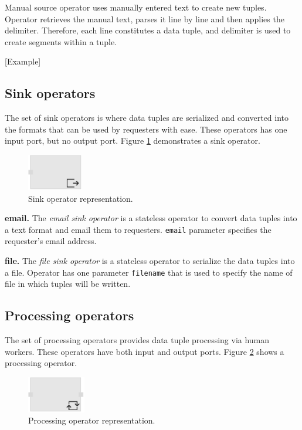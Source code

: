 Manual source operator uses manually entered text to create new tuples. Operator 
retrieves the manual text, parses it line by line and then applies the delimiter. 
Therefore, each line constitutes a data tuple, and delimiter is used to create segments 
within a tuple.

[Example]

\subsection{Sink operators}
The set of sink operators is where data tuples are serialized and converted into 
the formats that can be used by requesters with ease. These operators has one 
input port, but no output port. Figure \ref{fig:sink operator} demonstrates a sink operator.

\begin{figure}[ht]
	\centering
	\includegraphics[height=60px]{figures/SinkOperator.pdf}
	\caption{Sink operator representation.}
	\label{fig:sink operator}
\end{figure}

\textbf{email.}
The \textit{email sink operator} is a stateless operator to convert data tuples into a 
text format and email them to requesters. \texttt{email} parameter specifies the 
requester's email address. 

\textbf{file.}
The \textit{file sink operator} is a stateless operator to serialize the data tuples into 
a file. Operator has one parameter \texttt{filename} that is used to specify the name 
of file in which tuples will be written.

\subsection{Processing operators}
The set of processing operators provides data tuple processing via human workers. 
These operators have both input and output ports. Figure \ref{fig:processing operator} shows 
a processing operator.

\begin{figure}[ht]
	\centering
	\includegraphics[height=60px]{figures/ProcessingOperator.pdf}
	\caption{Processing operator representation.}
	\label{fig:processing operator}
\end{figure}

